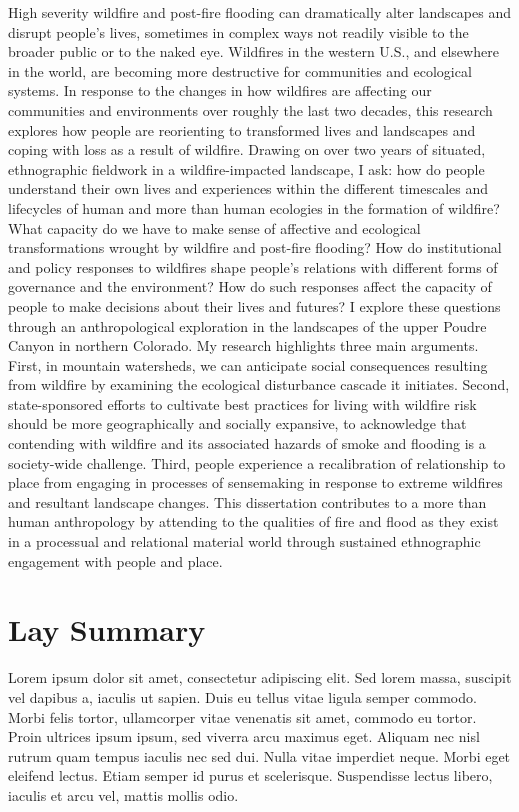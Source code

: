 \documentclass[
]{article}
\begin{document}
High severity wildfire and post-fire flooding can dramatically alter landscapes and disrupt people's lives, sometimes in complex ways not readily visible to the broader public or to the naked eye. Wildfires in the western U.S., and elsewhere in the world, are becoming more destructive for communities and ecological systems. In response to the changes in how wildfires are affecting our communities and environments over roughly the last two decades, this research explores how people are reorienting to transformed lives and landscapes and coping with loss as a result of wildfire. Drawing on over two years of situated, ethnographic fieldwork in a wildfire-impacted landscape, I ask: how do people understand their own lives and experiences within the different timescales and lifecycles of human and more than human ecologies in the formation of wildfire? What capacity do we have to make sense of affective and ecological transformations wrought by wildfire and post-fire flooding? How do institutional and policy responses to wildfires shape people's relations with different forms of governance and the environment? How do such responses affect the capacity of people to make decisions about their lives and futures? I explore these questions through an anthropological exploration in the landscapes of the upper Poudre Canyon in northern Colorado. My research highlights three main arguments. First, in mountain watersheds, we can anticipate social consequences resulting from wildfire by examining the ecological disturbance cascade it initiates. Second, state-sponsored efforts to cultivate best practices for living with wildfire risk should be more geographically and socially expansive, to acknowledge that contending with wildfire and its associated hazards of smoke and flooding is a society-wide challenge. Third, people experience a recalibration of relationship to place from engaging in processes of sensemaking in response to extreme wildfires and resultant landscape changes. This dissertation contributes to a more than human anthropology by attending to the qualities of fire and flood as they exist in a processual and relational material world through sustained ethnographic engagement with people and place.

\clearpage

\section*{Lay Summary}

Lorem ipsum dolor sit amet, consectetur adipiscing elit. Sed lorem massa, suscipit vel dapibus a, iaculis ut sapien. Duis eu tellus vitae ligula semper commodo. Morbi felis tortor, ullamcorper vitae venenatis sit amet, commodo eu tortor. Proin ultrices ipsum ipsum, sed viverra arcu maximus eget. Aliquam nec nisl rutrum quam tempus iaculis nec sed dui. Nulla vitae imperdiet neque. Morbi eget eleifend lectus. Etiam semper id purus et scelerisque. Suspendisse lectus libero, iaculis et arcu vel, mattis mollis odio.
\end{document}
